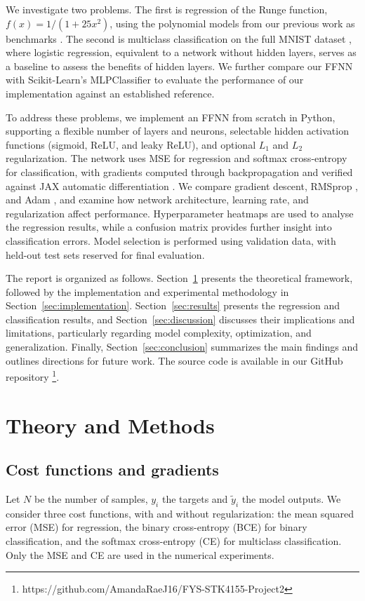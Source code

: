\documentclass[amssymb,twocolumn,aps]{revtex4}
\begin{document}
We investigate two problems. The first is regression of the Runge function,$f(x)=1/(1+25x^2)$, using the polynomial models from our previous work as benchmarks \cite{project1}. The second is multiclass classification on the full MNIST dataset \cite{lecun}, where logistic regression, equivalent to a network without hidden layers, serves as a baseline to assess the benefits of hidden layers. We further compare our FFNN with Scikit-Learn's MLPClassifier to evaluate the performance of our implementation against an established reference.

To address these problems, we implement an FFNN from scratch in Python, supporting a flexible number of layers and neurons, selectable hidden activation functions (sigmoid, ReLU, and leaky ReLU), and optional $L_1$ and $L_2$ regularization. The network uses MSE for regression and softmax cross-entropy for classification, with gradients computed through backpropagation and verified against JAX automatic differentiation \cite{jax2018}. We compare gradient descent, RMSprop \cite{tieleman2012}, and Adam \cite{kingma2015}, and examine how network architecture, learning rate, and regularization affect performance. Hyperparameter heatmaps are used to analyse the regression results, while a confusion matrix provides further insight into classification errors. Model selection is performed using validation data, with held-out test sets reserved for final evaluation.

The report is organized as follows. Section~\ref{sec:methods} presents the theoretical framework, followed by the implementation and experimental methodology in Section~\ref{sec:implementation}. Section~\ref{sec:results} presents the regression and classification results, and Section~\ref{sec:discussion} discusses their implications and limitations, particularly regarding model complexity, optimization, and generalization. Finally, Section~\ref{sec:conclusion} summarizes the main findings and outlines directions for future work. The source code is available in our GitHub repository \footnote{https://github.com/AmandaRaeJ16/FYS-STK4155-Project2}.

\section{Theory and Methods}\label{sec:methods}
\subsection{Cost functions and gradients}
Let $N$ be the number of samples, $y_i$ the targets and $\tilde{y}_i$ the model outputs.
We consider three cost functions, with and without regularization: the mean squared error (MSE) for regression, the binary cross-entropy (BCE) for binary classification, and the softmax cross-entropy (CE) for multiclass classification. Only the MSE and CE are used in the numerical experiments.
\end{document}
